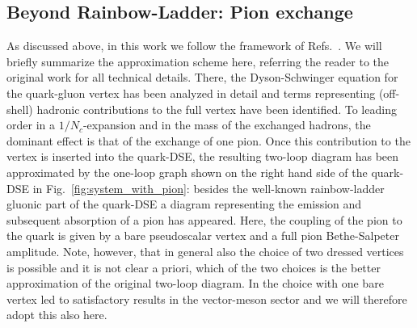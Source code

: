 \subsection{Beyond Rainbow-Ladder: Pion exchange}
\label{subsec:pion_exchange}


As discussed above, in this work we follow the framework of 
Refs.~\cite{Fischer:2007ze,Fischer:2008sp,Fischer:2008wy}. We will briefly summarize
the approximation scheme here, referring the reader to the original work for 
all technical details. There, the Dyson-Schwinger
equation for the quark-gluon vertex has been analyzed in detail and terms
representing (off-shell) hadronic contributions to the full vertex have been 
identified. To leading order in a $1/N_c$-expansion and in the mass of the 
exchanged hadrons, the dominant effect is that of the exchange of one pion.
Once this contribution to the vertex is inserted into the quark-DSE, the 
resulting two-loop diagram has been approximated by the one-loop graph shown
on the right hand side of the quark-DSE in Fig.~\ref{fig:system_with_pion}:
besides the well-known rainbow-ladder gluonic part of the quark-DSE a 
diagram representing the emission and subsequent absorption of a pion has 
appeared. Here, the coupling of the pion to the quark is given by a bare
pseudoscalar vertex and a full pion Bethe-Salpeter amplitude. Note, however, that
in general also the choice of two dressed vertices is possible and it is not 
clear a priori, which of the two choices is the better approximation of the
original two-loop diagram. In \cite{Fischer:2008wy} the choice
with one bare vertex led to satisfactory results in the vector-meson
sector and we will therefore adopt this also here.

